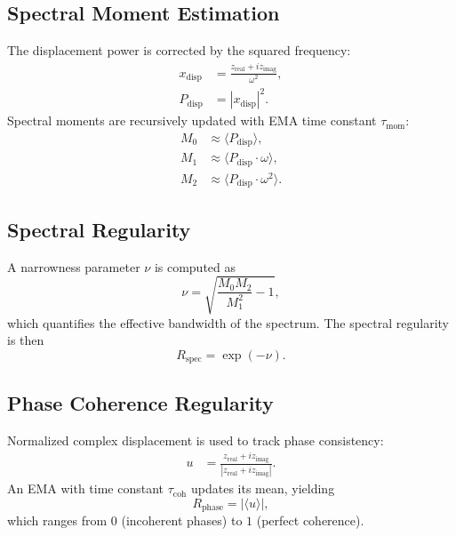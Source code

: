 \documentclass[11pt]{article}
\begin{document}
\subsection{Spectral Moment Estimation}
The displacement power is corrected by the squared frequency:
\begin{align}
x_{\text{disp}} &= \frac{z_{\text{real}} + i z_{\text{imag}}}{\omega^2}, \\
P_{\text{disp}} &= |x_{\text{disp}}|^2.
\end{align}
Spectral moments are recursively updated with EMA time constant $\tau_{\text{mom}}$:
\begin{align}
M_0 &\approx \langle P_{\text{disp}} \rangle, \\
M_1 &\approx \langle P_{\text{disp}} \cdot \omega \rangle, \\
M_2 &\approx \langle P_{\text{disp}} \cdot \omega^2 \rangle.
\end{align}

\subsection{Spectral Regularity}
A narrowness parameter $\nu$ is computed as
\begin{equation}
\nu = \sqrt{\frac{M_0 M_2}{M_1^2} - 1},
\end{equation}
which quantifies the effective bandwidth of the spectrum. 
The spectral regularity is then
\begin{equation}
R_{\text{spec}} = \exp(-\nu).
\end{equation}

\subsection{Phase Coherence Regularity}
Normalized complex displacement is used to track phase consistency:
\begin{align}
u &= \frac{z_{\text{real}} + i z_{\text{imag}}}{|z_{\text{real}} + i z_{\text{imag}}|}.
\end{align}
An EMA with time constant $\tau_{\text{coh}}$ updates its mean, yielding
\begin{equation}
R_{\text{phase}} = \left| \langle u \rangle \right|,
\end{equation}
which ranges from $0$ (incoherent phases) to $1$ (perfect coherence).
\end{document}
